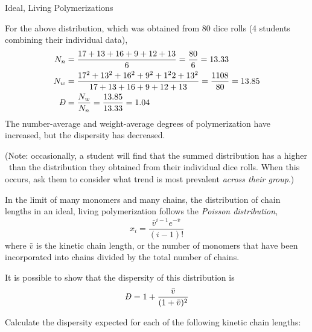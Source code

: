 \begin{activity}{Ideal, Living Polymerizations}
\begin{ctqs}
		\begin{solution}[3in]
			For the above distribution, which was obtained from 80 dice rolls (4 students combining their individual data),
			\begin{align*}
				N_n &= \frac{17+13+16+9+12+13}{6} = \frac{80}{6} = 13.33\\
				N_w &= \frac{17^2+13^2+16^2+9^2+1^22+13^2}{17+13+16+9+12+13} = \frac{1108}{80} = 13.85\\
				\PDImath &= \frac{N_w}{N_n} = \frac{13.85}{13.33} = 1.04
			\end{align*}
			The number-average and weight-average degrees of polymerization have increased, but the dispersity has decreased.
			
			(Note: occasionally, a student will find that the summed distribution has a higher \PDItext\ than the distribution they obtained from their individual dice rolls.  When this occurs, ask them to consider what trend is most prevalent \emph{across their group}.)
		\end{solution}
	
\end{ctqs}

\begin{infobox}

	In the limit of many monomers and many chains, the distribution of chain lengths in an ideal, living polymerization follows the \emph{Poisson distribution},
	\begin{equation*}
		x_i = \frac{\bar v^{i-1}e^{-\bar v}}{(i-1)!}
	\end{equation*}
	where $\bar v$ is the kinetic chain length, or the number of monomers that have been incorporated into chains divided by the total number of chains.
	
	It is possible to show that the dispersity of this distribution is
	\begin{equation*}
		\PDImath = 1+\frac{\bar v}{(1+\bar v)^2}
	\end{equation*}

	\label{\labelbase:infobox:poisson}

\end{infobox}

\begin{ctqs}

	\question Calculate the dispersity expected for each of the following kinetic chain lengths: \label{\labelbase:ctq:poissondispersities}
	
		\begin{enumerate}
		

\end{enumerate}
\end{ctqs}
\end{activity}
